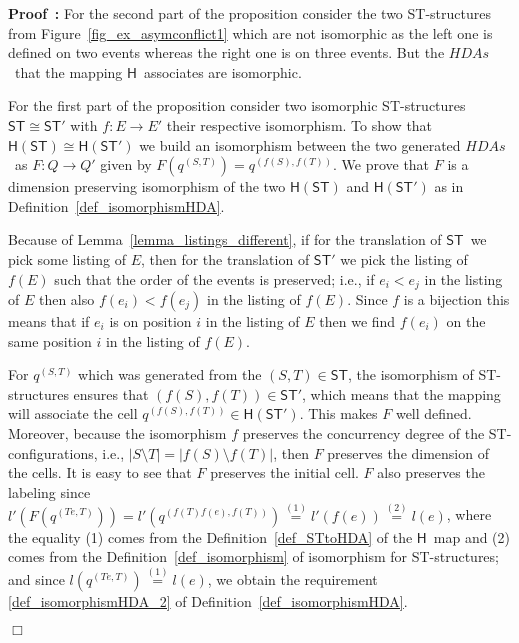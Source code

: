 \documentclass[submission,copyright,creativecommons]{eptcs}
\newenvironment{proof}[1][\!\!\,]{\vspace{1ex}\noindent\textbf{Proof #1: }}{\hfill$\Box$\vspace{2ex}}
\newcommand\HDAs{\ensuremath{\mathit{HDAs}}}
\newcommand\ST{\ensuremath{\mathsf{ST}}}
\newcommand\isomorphic{\ensuremath{\cong}}
\newcommand\stintoh{\ensuremath{\mathsf{H}}}
\begin{document}
\begin{proof}
For the second part of the proposition consider the two ST-structures from Figure~\ref{fig_ex_asymconflict1} which are not isomorphic as the left one is defined on two events whereas the right one is on three events. But the \HDAs\ that the mapping \stintoh\ associates are isomorphic.

\vspace{1ex}
For the first part of the proposition consider two isomorphic ST-structures $\ST\isomorphic\ST'$ with $f:E\rightarrow E'$ their respective isomorphism. To show that $\stintoh(\ST)\isomorphic\stintoh(\ST')$ we build an isomorphism between the two generated \HDAs\ as $F:Q\rightarrow Q'$ given by $F(q^{(S,T)})=q^{(f(S),f(T))}$. We prove that $F$ is a dimension preserving isomorphism of the two $\stintoh(\ST)$ and $\stintoh(\ST')$ as in Definition~\ref{def_isomorphismHDA}.

Because of Lemma~\ref{lemma_listings_different}, if for the translation of \ST\ we pick some listing of $E$, then for the translation of $\ST'$ we pick the listing of $f(E)$ such that the order of the events is preserved; i.e., if $e_{i}<e_{j}$ in the listing of $E$ then also $f(e_{i})<f(e_{j})$ in the listing of $f(E)$. Since $f$ is a bijection this means that if $e_{i}$ is on position $i$ in the listing of $E$ then  we find $f(e_{i})$ on the same position $i$ in the listing of $f(E)$.

For $q^{(S,T)}$ which was generated from the $(S,T)\in\ST$, the isomorphism of ST-structures ensures that $(f(S),f(T))\in\ST'$, which means that the mapping will associate the cell $q^{(f(S),f(T))}\in\stintoh(\ST')$. This makes $F$ well defined. Moreover, because the isomorphism $f$ preserves the concurrency degree of the ST-configurations, i.e., $|S\setminus T|=|f(S)\setminus f(T)|$, then $F$ preserves the dimension of the cells.
It is easy to see that $F$ preserves the initial cell.
$F$ also preserves the labeling since $l'(F(q^{(Te,T)}))=l'(q^{(f(T)f(e),f(T))})\stackrel{(1)}{=}l'(f(e))\stackrel{(2)}{=}l(e)$, where the equality (1) comes from the Definition~\ref{def_STtoHDA} of the \stintoh\ map and (2) comes from the Definition~\ref{def_isomorphism} of isomorphism for ST-structures; and since $l(q^{(Te,T)})\stackrel{(1)}{=}l(e)$, we obtain the requirement \ref{def_isomorphismHDA_2} of Definition~\ref{def_isomorphismHDA}.


\end{proof}
\end{document}
